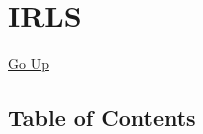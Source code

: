 \chapter*{\color{headtoc} IRLS}
\hypertarget{ecldoc:toc:root/IRLS}{}
\hyperlink{ecldoc:toc:}{Go Up}


\section*{Table of Contents}
{\renewcommand{\arraystretch}{1.5}
\begin{longtable}{|p{\textwidth}|}
\hline
\end{longtable}
}

